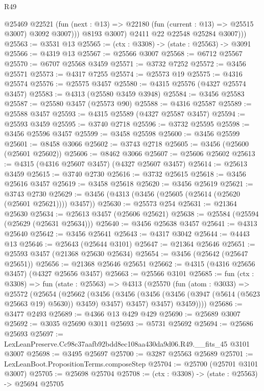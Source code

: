 \begin{lexlean}{R49}
\begin{coremodule}
                @25469
                @22521
                (fun (next : @13) => @22180 (fun (current : @13) => @25515 @3007) @3092 @3007)))
            @8193
            @3007)
          @2411
          @22
          @22548
          @25284
          @3007)))
@25563 := @3531 @13
@25565 := (ctx : @3308) -> (state : @25563) -> @3091
@25566 := @4319 @13
@25567 := @25566 @3007
@25568 := @6712 @25567
@25570 := @6707 @25568 @3459
@25571 := @3732 @7252
@25572 := @3456 @25571
@25573 := @4317 @7255
@25574 := @25573 @19
@25575 := @4316 @25574
@25576 := @25575 @3457
@25580 := @4315 @25576 (@4327 @25574 @3457)
@25583 := @4313 (@25580 @3459 @3948)
@25584 := @3456 @25583
@25587 := @25580 @3457 (@25573 @90)
@25588 := @4316 @25587
@25589 := @25588 @3457
@25593 := @4315 @25589 (@4327 @25587 @3457)
@25594 := @25593 @3459
@25595 := @3740 @2718
@25596 := @3732 @25595
@25598 := @3456 @25596 @3457
@25599 := @3458 @25598
@25600 := @3456 @25599
@25601 := @8458 @3066
@25602 := @3743 @2718
@25605 := @3456 (@25600 (@25601 @25602))
@25606 := @8462 @3066
@25607 := @25606 @25602
@25613 := @4315 (@4316 @25607 @3457) (@4327 @25607 @3457)
@25614 := @25613 @3459
@25615 := @3740 @2730
@25616 := @3732 @25615
@25618 := @3456 @25616 @3457
@25619 := @3458 @25618
@25620 := @3456 @25619
@25621 := @3743 @2730
@25629 := @3456 (@4313 (@3456 (@25605 (@25614 (@25620 (@25601 @25621)))) @3457))
@25630 := @25573 @254
@25631 := @21364 @25630
@25634 := @25613 @3457 (@25606 @25621)
@25638 := @25584 (@25594 (@25629 (@25631 @25634)))
@25640 := @3456 @25638 @3457
@25641 := @4313 @25640
@25642 := @3456 @25641
@25643 := @4317 @3042
@25644 := @4443 @13
@25646 := @25643 (@25644 @3101)
@25647 := @21364 @25646
@25651 := @25593 @3457 (@21368 @25630 @25634)
@25654 := @3456 (@25642 (@25647 @25651))
@25656 := @21368 @25646 @25651
@25662 := @4315 (@4316 @25656 @3457) (@4327 @25656 @3457)
@25663 := @25566 @3101
@25685 := fun (ctx : @3308) =>
  fun (state : @25563) =>
  @4313
    (@25570
      (fun (atom : @3033) =>
      @25572
        (@25654
          (@25662
            (@3456
              (@3456 (@3456 (@3456 (@3947 (@5614 (@5623 @25663 @19) @5630)) @3459) @3457) @3457)
              @3457)
            @3459))))
@25686 := @3477 @2493
@25689 := @4366 @13 @429 @429
@25690 := @25689 @3007
@25692 := @3035 @25690 @3011
@25693 := @5731 @25692
@25694 := @25686 @25693
@25697 := LexLeanPreserve.Cc98c37aafb92bdd8ec108aa430da9d06.R49.__fits_45 @3101 @3007
@25698 := @3495 @25697
@25700 := @3287 @25563 @25689
@25701 := LexLeanBoot.PropositionTerms.composeStep
@25704 := @25700 (@25701 @3101 @3007)
@25705 := @25698 @25704
@25708 := (ctx : @3308) -> (state : @25563) -> @25694 @25705

\end{coremodule}
\end{lexlean}
